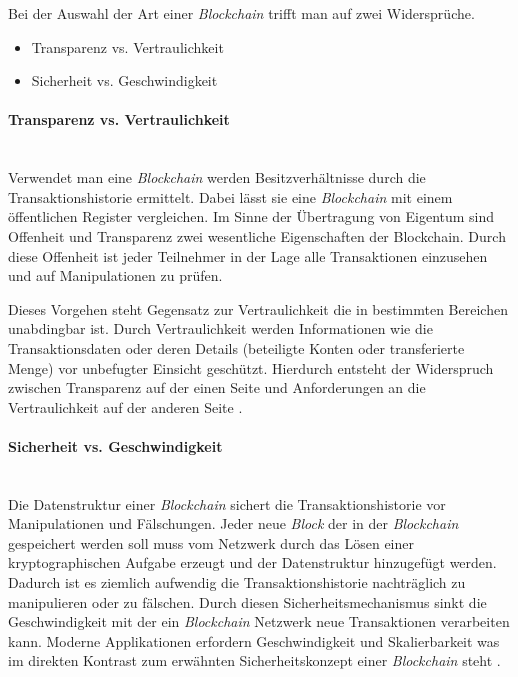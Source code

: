 Bei der Auswahl der Art einer \textit{Blockchain} trifft man auf zwei Widersprüche.

\begin{itemize}
  \item Transparenz vs. Vertraulichkeit
  \item Sicherheit vs. Geschwindigkeit
\end{itemize}

\paragraph{Transparenz vs. Vertraulichkeit}$~~$\\
Verwendet man eine \textit{Blockchain} werden Besitzverhältnisse durch die Transaktionshistorie ermittelt. Dabei lässt sie eine \textit{Blockchain} mit einem öffentlichen Register vergleichen. Im Sinne der Übertragung von Eigentum sind Offenheit und Transparenz zwei wesentliche Eigenschaften der Blockchain. Durch diese Offenheit ist jeder Teilnehmer in der Lage alle Transaktionen einzusehen und auf Manipulationen zu prüfen.

Dieses Vorgehen steht Gegensatz zur Vertraulichkeit die in bestimmten Bereichen unabdingbar ist. Durch Vertraulichkeit werden Informationen wie die Transaktionsdaten oder deren Details (beteiligte Konten oder transferierte Menge) vor unbefugter Einsicht geschützt. Hierdurch entsteht der Widerspruch zwischen Transparenz auf der einen Seite und Anforderungen an die Vertraulichkeit auf der anderen Seite \citep{Drescher2017}.

\paragraph{Sicherheit vs. Geschwindigkeit}$~~$\\
Die Datenstruktur einer \textit{Blockchain} sichert die Transaktionshistorie vor Manipulationen und Fälschungen. Jeder neue \textit{Block} der in der \textit{Blockchain} gespeichert werden soll muss vom Netzwerk durch das Lösen einer kryptographischen Aufgabe erzeugt und der Datenstruktur hinzugefügt werden. Dadurch ist es ziemlich aufwendig die Transaktionshistorie nachträglich zu manipulieren oder zu fälschen. Durch diesen Sicherheitsmechanismus sinkt die Geschwindigkeit mit der ein \textit{Blockchain} Netzwerk neue Transaktionen verarbeiten kann. Moderne Applikationen erfordern Geschwindigkeit und Skalierbarkeit was im direkten Kontrast zum erwähnten Sicherheitskonzept einer \textit{Blockchain} steht \citep{Drescher2017}.

